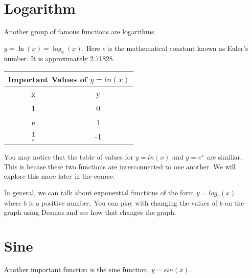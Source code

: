 \documentclass{ximera}
\begin{document}
\section{Logarithm}
Another group of famous functions are logarithms.

\begin{example}
$y=\ln(x)=\log_e(x)$.  Here $e$ is the mathematical constant known as Euler's number.  It is approximately 2.71828.


\begin{tabular}{ |c || c|  }
 \hline
 \multicolumn{2}{|c|}{Important Values of $y=ln(x)$} \\
\hline
 \hline
 x & y\\
 \hline
 1&0\\
 e&1\\
 $\frac{1}{e}$&-1\\
 \hline
\end{tabular}

You may notice that the table of values for $y=ln(x)$ and $y=e^x$ are similiar.  This is becase these two functions are interconnected to one another.  We will explore this more later in the course.

\end{example}

In general, we can talk about exponential functions of the form $y=log_b(x)$ where $b$ is a positive number.  You can play with changing the values of $b$ on the graph using Desmos and see how that changes the graph.  

\begin{center}  
\end{center}


\section{Sine}
Another important function is the sine function, $y=sin(x)$. 
\end{document}
